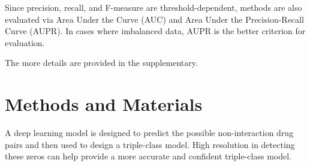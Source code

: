 \documentclass[unnumsec,webpdf,contemporary,large]{oup-authoring-template}%
\theoremstyle{thmstyleone}%
\theoremstyle{thmstyletwo}%
\theoremstyle{thmstylethree}%
\begin{document}

Since precision, recall, and F-measure are threshold-dependent, methods are also evaluated via Area Under the Curve (AUC)
and Area Under the Precision-Recall Curve (AUPR).
In cases where imbalanced data, AUPR is the better criterion for evaluation.

The more details are provided in the supplementary.
\section{Methods and Materials}\label{sec3}
A deep learning model is designed to predict the possible non-interaction drug pairs and then used to design a triple-class model. High resolution in detecting these zeros can help provide a more accurate and confident triple-class model.
\end{document}
